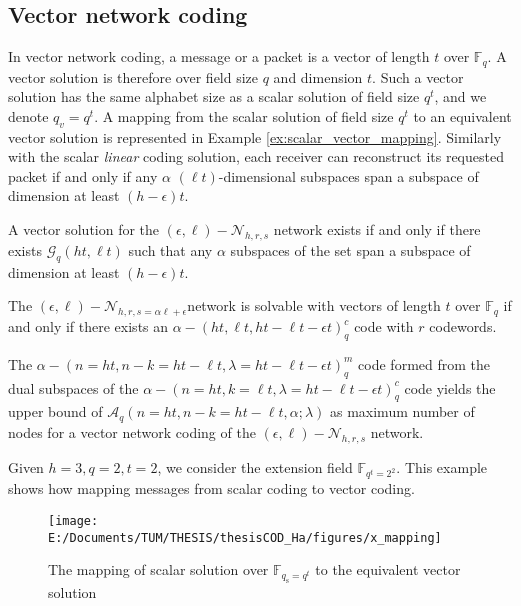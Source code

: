 \subsection{Vector network coding \label{subsec:Vector-network-coding}}

In vector network coding, a message or a packet is a vector of length
$t$ over $\ensuremath{\mathbb{F}}_{q}$. A vector solution is therefore
over field size $q$ and dimension $t$. Such a vector solution has
the same alphabet size as a scalar solution of field size $q^{t}$,
and we denote $q_{v}=q^{t}$. A mapping from the scalar solution of
field size $q^{t}$ to an equivalent vector solution is represented
in Example \ref{ex:scalar_vector_mapping}. Similarly with the scalar
\textit{linear} coding solution, each receiver can reconstruct its
requested packet if and only if any $\alpha$ $\left(\ell t\right)$-dimensional
subspaces span a subspace of dimension at least $\left(h-\epsilon\right)t$.
\begin{thm}
 A vector solution for the $(\epsilon,\ell)-\mathcal{N}_{h,r,s}$
network exists if and only if there exists $\mathcal{G}_{q}\left(ht,\ell t\right)$
such that any $\alpha$ subspaces of the set span a subspace of dimension
at least $\left(h-\epsilon\right)t$. 
\end{thm}
%
\begin{thm}
 The $(\epsilon,\ell)-\mathcal{N}_{h,r,s=\alpha\ell+\epsilon}$network
is solvable with vectors of length $t$ over $\ensuremath{\mathbb{F}}_{q}$
if and only if there exists an $\alpha-\left(ht,\ell t,ht-\ell t-\epsilon t\right)_{q}^{c}$
code with $r$ codewords. 
\end{thm}
\begin{cor}
The $\alpha-\left(n=ht,n-k=ht-\ell t,\lambda=ht-\ell t-\epsilon t\right)_{q}^{m}$
code formed from the dual subspaces of the $\alpha-\left(n=ht,k=\ell t,\lambda=ht-\ell t-\epsilon t\right)_{q}^{c}$
code yields the upper bound of $\mathcal{A}_{q}\left(n=ht,n-k=ht-\ell t,\alpha;\lambda\right)$
as maximum number of nodes for a vector network coding of the $(\epsilon,\ell)-\mathcal{N}_{h,r,s}$
network. \label{cor:dual_subspaces}
\end{cor}
\begin{example}
\label{ex:scalar_vector_mapping} 

Given $h=3,q=2,t=2$, we consider the extension field $\ensuremath{\mathbb{F}}_{q^{t}=2^{2}}$.
This example shows how mapping messages from scalar coding to vector
coding.
\begin{figure}[H]
\caption{The mapping of scalar solution over $\ensuremath{\mathbb{F}}_{q_{\mathrm{s}}=q^{t}}$
to the equivalent vector solution\label{fig:x_mapping}}

\centering{}\texttt{[image: E:/Documents/TUM/THESIS/thesisCOD\_Ha/figures/x\_mapping]}
\end{figure}
\end{example}
